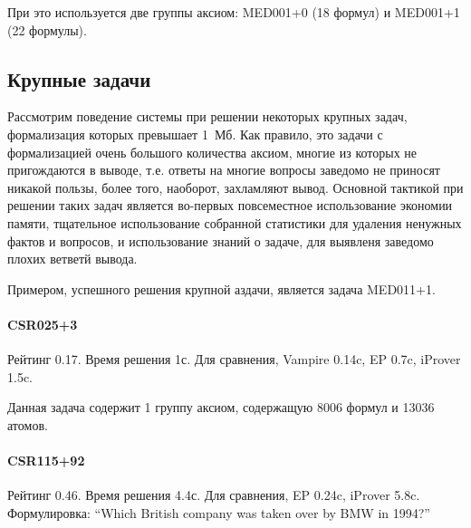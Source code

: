При это используется две группы аксиом: MED001+0 (18 формул) и MED001+1 (22 формулы).







\subsection{Крупные задачи}
Рассмотрим поведение системы при решении некоторых крупных задач, формализация которых превышает 1~Мб. Как правило, это задачи с формализацией очень большого количества аксиом, многие из которых не пригождаются в выводе, т.е. ответы на многие вопросы заведомо не приносят никакой пользы, более того, наоборот, захламляют вывод. Основной тактикой при решении таких задач является во-первых повсеместное использование экономии памяти, тщательное использование собранной статистики для удаления ненужных фактов и вопросов, и использование знаний о задаче, для выявленя заведомо плохих ветветй вывода.

Примером, успешного решения крупной аздачи, является задача MED011+1.

\paragraph{CSR025+3}
Рейтинг 0.17. Время решения 1с. Для сравнения, Vampire 0.14c, EP 0.7c, iProver 1.5c.

Данная задача содержит 1 группу аксиом, содержащую 8006 формул и 13036 атомов.

\paragraph{CSR115+92}
Рейтинг 0.46. Время решения 4.4с. Для сравнения, EP 0.24c, iProver 5.8c.
Формулировка: ``Which British company was taken over by BMW in 1994?''

